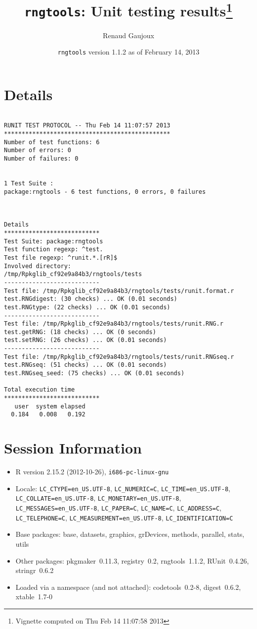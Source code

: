 \documentclass[10pt]{article}
\author{Renaud Gaujoux}
\title{\texttt{rngtools}: Unit testing results\footnote{Vignette computed  on Thu Feb 14 11:07:58 2013}}
\date{\texttt{rngtools} version 1.1.2 as of February 14, 2013}
\begin{document}
\maketitle

\section{Details}
\begin{verbatim}

RUNIT TEST PROTOCOL -- Thu Feb 14 11:07:57 2013 
*********************************************** 
Number of test functions: 6 
Number of errors: 0 
Number of failures: 0 

 
1 Test Suite : 
package:rngtools - 6 test functions, 0 errors, 0 failures



Details 
*************************** 
Test Suite: package:rngtools 
Test function regexp: ^test. 
Test file regexp: ^runit.*.[rR]$ 
Involved directory: 
/tmp/Rpkglib_cf92e9a84b3/rngtools/tests 
--------------------------- 
Test file: /tmp/Rpkglib_cf92e9a84b3/rngtools/tests/runit.format.r 
test.RNGdigest: (30 checks) ... OK (0.01 seconds)
test.RNGtype: (22 checks) ... OK (0.01 seconds)
--------------------------- 
Test file: /tmp/Rpkglib_cf92e9a84b3/rngtools/tests/runit.RNG.r 
test.getRNG: (18 checks) ... OK (0 seconds)
test.setRNG: (26 checks) ... OK (0.01 seconds)
--------------------------- 
Test file: /tmp/Rpkglib_cf92e9a84b3/rngtools/tests/runit.RNGseq.r 
test.RNGseq: (51 checks) ... OK (0.01 seconds)
test.RNGseq_seed: (75 checks) ... OK (0.01 seconds)

Total execution time
***************************
   user  system elapsed 
  0.184   0.008   0.192 

\end{verbatim}

\section*{Session Information}
\begin{itemize}\raggedright
  \item R version 2.15.2 (2012-10-26), \verb|i686-pc-linux-gnu|
  \item Locale: \verb|LC_CTYPE=en_US.UTF-8|, \verb|LC_NUMERIC=C|, \verb|LC_TIME=en_US.UTF-8|, \verb|LC_COLLATE=en_US.UTF-8|, \verb|LC_MONETARY=en_US.UTF-8|, \verb|LC_MESSAGES=en_US.UTF-8|, \verb|LC_PAPER=C|, \verb|LC_NAME=C|, \verb|LC_ADDRESS=C|, \verb|LC_TELEPHONE=C|, \verb|LC_MEASUREMENT=en_US.UTF-8|, \verb|LC_IDENTIFICATION=C|
  \item Base packages: base, datasets, graphics, grDevices, methods,
    parallel, stats, utils
  \item Other packages: pkgmaker~0.11.3, registry~0.2, rngtools~1.1.2,
    RUnit~0.4.26, stringr~0.6.2
  \item Loaded via a namespace (and not attached): codetools~0.2-8,
    digest~0.6.2, xtable~1.7-0
\end{itemize}
\end{document}
